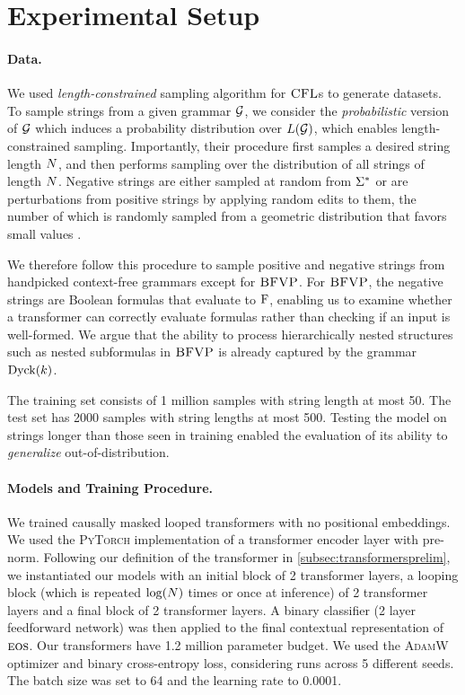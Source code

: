 \documentclass{article}
\begin{document}
\section{Experimental Setup}\label{app:expsetup}
\paragraph{Data.} We used  \emph{length-constrained} sampling algorithm for ${\textsc{CFL}}$s to generate datasets.
To sample strings from a given grammar ${{ \mathcal{G}}}$, we consider the \emph{probabilistic} version of ${{ \mathcal{G}}}$ which induces a probability distribution over ${L}({{ \mathcal{G}}})$, which enables length-constrained sampling.
Importantly, their procedure first samples a desired string length ${{ N}}$, and then performs sampling over the distribution of all strings of length ${{ N}}$. 
Negative strings are either sampled at random from ${{{{ \Sigma}}^*}}$ or are perturbations from positive strings by applying random edits to them, the number of which is randomly sampled from a geometric distribution that favors small values \citep{butoi2025trainingneuralnetworksrecognizers}.

We therefore follow this procedure to sample positive and negative strings from handpicked context-free grammars except for ${\textsc{BFVP}}$.
For ${\textsc{BFVP}}$, the negative strings are Boolean formulas that evaluate to ${\mathbin{\mathrm{F}}}$, enabling us to examine whether a transformer can correctly evaluate formulas rather than checking if an input is well-formed. 
We argue that the ability to process hierarchically nested structures such as nested subformulas in ${\textsc{BFVP}}$ is already captured by the grammar $\dyck{\idxk}$.

The training set consists of 1 million samples with string length at most 50. 
The test set has 2000 samples with string lengths at most 500. 
Testing the model on strings longer than those seen in training enabled the evaluation of its ability to \emph{generalize} out-of-distribution.

\paragraph{Models and Training Procedure.}
We trained causally masked looped transformers with no positional embeddings. 
We used the \textsc{PyTorch} implementation of a transformer encoder layer with pre-norm.
Following our definition of the transformer in \cref{subsec:transformersprelim}, we instantiated our models with an initial block of 2 transformer layers, a looping block (which is repeated $\log({{ N}})$ times or once at inference) of 2 transformer layers and a final block of 2 transformer layers. 
A binary classifier (2 layer feedforward network) was then applied to the final contextual representation of ${{\textsc{eos}}}$.
Our transformers have 1.2 million parameter budget. 
We used the \textsc{AdamW} optimizer \citep{loshchilov2019decoupledweightdecayregularization} and binary cross-entropy loss, considering runs across 5 different seeds.
The batch size was set to 64 and the learning rate to 0.0001.


\end{document}
